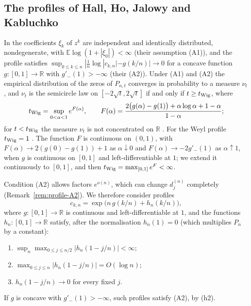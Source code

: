 \documentclass[11pt]{amsart}
\theoremstyle{definition}
\theoremstyle{remark}
\numberwithin{equation}{section}
\newcommand{\R}{\mathbb{R}}
\newcommand{\E}{\mathbb{E}}
\begin{document}
\subsection{The profiles of Hall, Ho, Jalowy and Kabluchko}\label{subsec:hhjk}
In \cite{HHJK} the coefficients $\xi_k$ of $z^k$ are independent and identically distributed, nondegenerate, with $\E\log(1+|\xi_0|)<\infty$ (their assumption (A1)), and the profile satisfies $\sup_{0\le k\le n}|\frac1n\log|c_{k,n}|-g(k/n)|\to0$ for a concave function $g:[0,1]\to\R$ with $g'_-(1)>-\infty$ (their (A2)). Under (A1) and (A2) the empirical distribution of the zeros of $P_{n,t}$ converges in probability to a measure $\nu_t$ \cite[Theorem~2.6]{HHJK}, and $\nu_t$ is the semicircle law on $[-2\sqrt t,2\sqrt t]$ if and only if $t\ge t_{\rm Wig}$, where
\begin{equation}\label{eq:profile-F}
t_{\rm Wig}=\sup_{0<\alpha<1}e^{F(\alpha)},\qquad F(\alpha)=\frac{2\bigl(g(\alpha)-g(1)\bigr)+\alpha\log\alpha+1-\alpha}{1-\alpha};
\end{equation}
for $t<t_{\rm Wig}$ the measure $\nu_t$ is not concentrated on $\R$ \cite[Theorem~2.12 and (2.17)]{HHJK}. For the Weyl profile $t_{\rm Wig}=1$ \cite[Example~2.13]{HHJK}. The function $F$ is continuous on $(0,1)$, with $F(\alpha)\to2(g(0)-g(1))+1$ as $\alpha\downarrow0$ and $F(\alpha)\to-2g'_-(1)$ as $\alpha\uparrow1$, when $g$ is continuous on $[0,1]$ and left-differentiable at $1$; we extend it continuously to $[0,1]$, and then $t_{\rm Wig}=\max_{[0,1]}e^F<\infty$.

Condition (A2) allows factors $e^{o(n)}$, which can change $d^{(n)}_j$ completely (Remark~\ref{rem:profile-A2}). We therefore consider profiles
\[
c_{k,n}=\exp\bigl(n\,g(k/n)+h_n(k/n)\bigr),
\]
where $g:[0,1]\to\R$ is continuous and left-differentiable at $1$, and the functions $h_n:[0,1]\to\R$ satisfy, after the normalisation $h_n(1)=0$ (which multiplies $P_n$ by a constant):
\begin{enumerate}
\item[(h1)] $\sup_n\max_{0\le j\le n/2}|h_n(1-j/n)|<\infty$;
\item[(h2)] $\max_{0\le j\le n}|h_n(1-j/n)|=O(\log n)$;
\item[(h3)] $h_n(1-j/n)\to0$ for every fixed $j$.
\end{enumerate}
If $g$ is concave with $g'_-(1)>-\infty$, such profiles satisfy (A2), by (h2).
\end{document}
